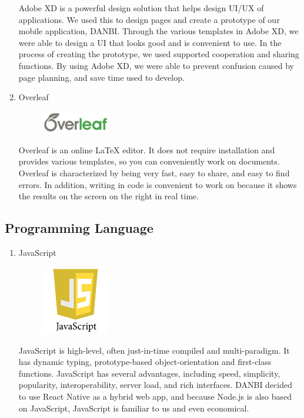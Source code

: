 \documentclass[conference]{IEEEtran}
\begin{document}
\begin{enumerate}
Adobe XD is a powerful design solution that helps design UI/UX of applications. We used this to design pages and create a prototype of our mobile application, DANBI. Through the various templates in Adobe XD, we were able to design a UI that looks good and is convenient to use. In the process of creating the prototype, we used supported cooperation and sharing functions. By using Adobe XD, we were able to prevent confusion caused by page planning, and save time used to develop.

\item Overleaf
\par \begin{figure}[h!]
\includegraphics[width=3cm]{image/Overleaf.png}
\centering
\end{figure}

Overleaf is an online LaTeX editor. It does not require installation and provides various templates, so you can conveniently work on documents. Overleaf is characterized by being very fast, easy to share, and easy to find errors. In addition, writing in code is convenient to work on because it shows the results on the screen on the right in real time.

\end{enumerate}
\subsection{Programming Language}
\setlength{\parindent}{2ex}

\begin{enumerate}
\item JavaScript
\par \begin{figure}[h!]
\includegraphics[width=3cm]{image/JavaScript.png}
\centering
\end{figure}
JavaScript is high-level, often just-in-time compiled and multi-paradigm. It has dynamic typing, prototype-based object-orientation and first-class functions. JavaScript has several advantages, including speed, simplicity, popularity, interoperability, server load, and rich interfaces. DANBI decided to use React Native as a hybrid web app, and because Node.js is also based on JavaScript, JavaScript is familiar to us and even economical.
\end{enumerate}
\end{document}
